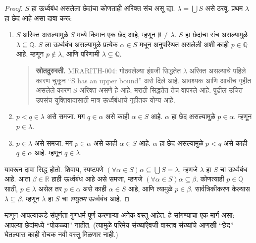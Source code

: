 \documentclass[11pt,a4paper,openany]{book}
\theoremstyle{definition}
\newcommand{\Rat}{\mathbb{Q}}
\begin{document}
\begin{proof}
$S$ हा ऊर्ध्वबंध असलेला छेदांचा कोणताही अरिक्त संच असू द्या. $\lambda
= \bigcup S$ असे ठरवू.
प्रथम $\lambda$ हा छेद आहे असा दावा करू:
\begin{enumerate}
\item $S$ अरिक्त असल्यामुळे $S$ मध्ये किमान एक छेद आहे, म्हणून
$\emptyset \neq \lambda$. $S$ हा छेदांचा संच असल्यामुळे $\lambda
\subseteq \Rat$. $S$ ला ऊर्ध्वबंध असल्यामुळे प्रत्येक $\alpha \in S$
मधून अनुपस्थित असलेली अशी काही $p \in \Rat$ आहे. म्हणून $p\notin \lambda$,
आणि परिणामी $\lambda \subsetneq \Rat$.
\begin{quote}\small\textbf{स्रोतदुरुस्ती.} MRARITH-004: गोठवलेल्या इंग्रजी सिद्धतेत $\lambda$ अरिक्त असल्याचे पहिले कारण चुकून “S has an upper bound” असे दिले आहे. आवश्यक आणि आधीच गृहीत असलेले कारण S अरिक्त असणे हे आहे; मराठी सिद्धतेत तेच वापरले आहे. पुढील उचित-उपसंच युक्तिवादासाठी मात्र ऊर्ध्वबंधाचे गृहीतक योग्य आहे.\end{quote}
\item $p < q \in \lambda$ असे समजा. मग $q \in \alpha$ असे काही
$\alpha \in S$ आहे. $\alpha$ हा छेद असल्यामुळे $p \in \alpha$.
म्हणून $p \in \lambda$.
\item $p \in \lambda$ असे समजा. मग $p \in \alpha$ असे काही
$\alpha \in S$ आहे. $\alpha$ हा छेद असल्यामुळे $p < q$ असे काही
$q \in \alpha$ आहे. म्हणून $q \in \lambda$.
\end{enumerate}
यावरून दावा सिद्ध होतो. शिवाय, स्पष्टपणे $(\forall \alpha \in S)\alpha
\subseteq \bigcup S = \lambda$, म्हणजे $\lambda$ हा $S$ चा ऊर्ध्वबंध
आहे. आता $\beta \in \mathbb{R}$ हाही ऊर्ध्वबंध आहे असे समजा, म्हणजे
$(\forall \alpha \in S)\alpha \subseteq \beta$. कोणत्याही $p \in \Rat$
साठी, $p \in \lambda$ असेल तर $p \in \alpha$ असे काही $\alpha \in S$
आहे, आणि त्यामुळे $p \in \beta$. सार्वत्रिकीकरण केल्यास $\lambda
\subseteq \beta$. म्हणून $\lambda$ हा $S$ चा \emph{लघुतम} ऊर्ध्वबंध आहे.
\end{proof}

म्हणून आपल्याकडे संपूर्णता गुणधर्म पूर्ण करणाऱ्या अनेक वस्तू आहेत.
हे सांगण्याचा एक मार्ग असा: आपल्या छेदांमध्ये ``पोकळ्या'' नाहीत.
(त्यामुळे परिमेय संख्यांऐवजी वास्तव संख्यांचे आणखी ``छेद'' घेतल्यास
काही रोचक नवी वस्तू मिळणार नाही.)
\end{document}
